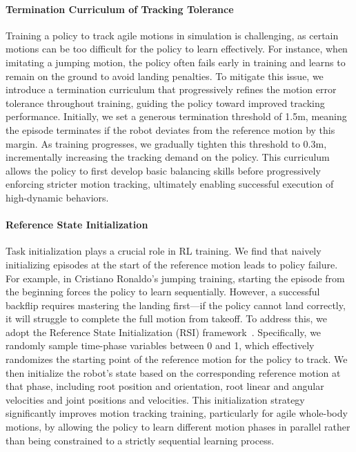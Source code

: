 \paragraph{Termination Curriculum of Tracking Tolerance}
Training a policy to track agile motions in simulation is challenging, as certain motions can be too difficult for the policy to learn effectively. For instance, when imitating a jumping motion, the policy often fails early in training and learns to remain on the ground to avoid landing penalties. To mitigate this issue, we introduce a termination curriculum that progressively refines the motion error tolerance throughout training, guiding the policy toward improved tracking performance. Initially, we set a generous termination threshold of 1.5m, meaning the episode terminates if the robot deviates from the reference motion by this margin. As training progresses, we gradually tighten this threshold to 0.3m, incrementally increasing the tracking demand on the policy. This curriculum allows the policy to first develop basic balancing skills before progressively enforcing stricter motion tracking, ultimately enabling successful execution of high-dynamic behaviors.


\paragraph{Reference State Initialization}
Task initialization plays a crucial role in RL training. We find that naively initializing episodes at the start of the reference motion leads to policy failure. For example, in Cristiano Ronaldo's jumping training, starting the episode from the beginning forces the policy to learn sequentially. However, a successful backflip requires mastering the landing first—if the policy cannot land correctly, it will struggle to complete the full motion from takeoff. To address this, we adopt the Reference State Initialization (RSI) framework~\cite{peng2018deepmimic}. Specifically, we randomly sample time-phase variables between 0 and 1, which effectively randomizes the starting point of the reference motion for the policy to track. We then initialize the robot’s state based on the corresponding reference motion at that phase, including root position and orientation, root linear and angular velocities and joint positions and velocities. This initialization strategy significantly improves motion tracking training, particularly for agile whole-body motions, by allowing the policy to learn different motion phases in parallel rather than being constrained to a strictly sequential learning process.

